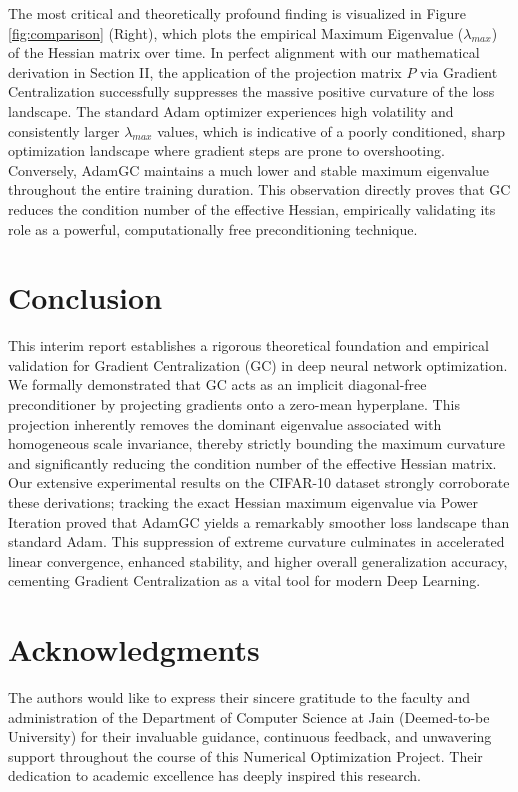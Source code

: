 \documentclass[conference]{IEEEtran}
\begin{document}
The most critical and theoretically profound finding is visualized in Figure \ref{fig:comparison} (Right), which plots the empirical Maximum Eigenvalue ($\lambda_{max}$) of the Hessian matrix over time. In perfect alignment with our mathematical derivation in Section II, the application of the projection matrix $P$ via Gradient Centralization successfully suppresses the massive positive curvature of the loss landscape. The standard Adam optimizer experiences high volatility and consistently larger $\lambda_{max}$ values, which is indicative of a poorly conditioned, sharp optimization landscape where gradient steps are prone to overshooting. Conversely, AdamGC maintains a much lower and stable maximum eigenvalue throughout the entire training duration. This observation directly proves that GC reduces the condition number of the effective Hessian, empirically validating its role as a powerful, computationally free preconditioning technique.

\section{Conclusion}
This interim report establishes a rigorous theoretical foundation and empirical validation for Gradient Centralization (GC) in deep neural network optimization. We formally demonstrated that GC acts as an implicit diagonal-free preconditioner by projecting gradients onto a zero-mean hyperplane. This projection inherently removes the dominant eigenvalue associated with homogeneous scale invariance, thereby strictly bounding the maximum curvature and significantly reducing the condition number of the effective Hessian matrix. Our extensive experimental results on the CIFAR-10 dataset strongly corroborate these derivations; tracking the exact Hessian maximum eigenvalue via Power Iteration proved that AdamGC yields a remarkably smoother loss landscape than standard Adam. This suppression of extreme curvature culminates in accelerated linear convergence, enhanced stability, and higher overall generalization accuracy, cementing Gradient Centralization as a vital tool for modern Deep Learning.

\section*{Acknowledgments}
The authors would like to express their sincere gratitude to the faculty and administration of the Department of Computer Science at Jain (Deemed-to-be University) for their invaluable guidance, continuous feedback, and unwavering support throughout the course of this Numerical Optimization Project. Their dedication to academic excellence has deeply inspired this research.
\end{document}
